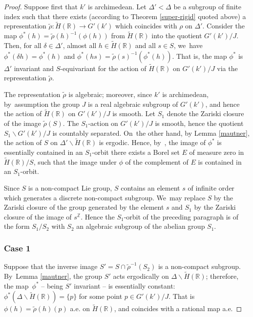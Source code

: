 \documentclass[JEP,XML,SOM,Unicode,published]{cedram}
\theoremstyle{definition}
\newcommand{\field}[1]{\mathbb{#1}}
\newcommand{\R}{\field{R}}
\newcommand{\Z}{\field{Z}}
\let\bs\backslash
\begin{document}
\begin{proof} Suppose first that $k'$ is archimedean. Let $\Delta '< \Delta $ be a subgroup of
finite index such that there exists (according to Theorem \ref{super-rigid} quoted above) a representation $\tilde \rho :\tilde
H(\R)\to G'(k')$ which coincides with $\rho $ on $\Delta '$. Consider the map $\phi ^*(h)=\tilde \rho (h)^{-1}(\phi (h))$ from $\tilde
H(\R)$ into the quotient $G'(k')/J$. Then, for all $\delta \in \Delta '$, almost all
$h\in \tilde H(\R)$ and all $s\in S$, we~have $\phi ^*(\delta h)= \phi ^*(h)$ and $\phi ^*(hs)=\tilde \rho (s)^{-1}(\phi ^*(h))$. That is,
the map $\phi ^*$ is $\Delta '$ invariant and $S$-equivariant for the action of $\tilde H(\R)$ on $G'(k')/J$ via the representation $\tilde
\rho $.\enlargethispage{-.5\baselineskip}%

The representation $\tilde \rho$ is algebraic; moreover, since $k'$ is
archimedean, by~assumption the group $J$ is a real algebraic subgroup
of $G'(k')$, and hence the action of $\tilde H(\R)$ on $G'(k')/J$ is
smooth. Let $S_1$ denote the Zariski closure of the image $\tilde
\rho (S)$. The $S_1$\nobreakdash-action on $G'(k')/J$ is smooth, hence the
quotient $S_1\bs G'(k')/J$ is countably separated. On~the other hand,
by Lemma \ref{mautner}, the action of $S$ on $\Delta '\bs \tilde
H(\R)$ is ergodic. Hence, by~\cite[Prop.\,(2.1.11)]{Z}, the
image of $\phi ^*$ is essentially contained in an $S_1$-orbit
\ie there exists a Borel set $E$ of measure zero in $\tilde H(\R)/S$,
such that the image under $\phi$ of the complement of $E$ is
contained in an $S_1$-orbit.

Since $S$ is a non-compact Lie group, $S$ contains an element $s$ of
infinite order which generates a discrete non-compact subgroup. We~may
replace $S$ by the Zariski closure of the group generated by the element $s$ and $S_1$
by the Zariski closure of the image of $s^{\Z}$. Hence the $S_1$-orbit of the preceding paragraph is of the
form $S_1/S_2$ with $S_2$ an algebraic subgroup of the abelian group
$S_1$.

\subsubsection*{Case 1}
Suppose that the inverse image $S'=S\cap \tilde \rho ^{-1}(S_2)$ is a
non-compact subgroup. By~Lemma \ref{mautner}, the group $S'$ acts
ergodically on $\Delta \bs \tilde H(\R)$; therefore, the map~$\phi ^*$ -- being $S'$ invariant -- is essentially constant: $\phi ^*(\Delta \bs \tilde
H(\R))=\{p\}$ for some point $p\in G'(k')/J$. That is $\phi (h)=\tilde
\rho (h)(p)$ a.e. on $\tilde{H}(\R)$, and coincides with a rational map a.e.


\end{proof}
\end{document}

